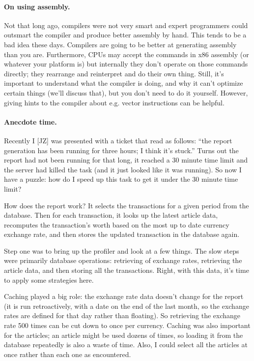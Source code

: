\documentclass[a4paper]{report}
\begin{document}
\paragraph{On using assembly.} Not that long ago, compilers were not very smart and expert programmers could outsmart the compiler and produce better assembly by hand. This tends to be a bad idea these days. Compilers are going to be better at generating assembly than you are. Furthermore, CPUs may accept the commands in x86 assembly (or whatever your platform is) but internally they don't operate on those commands directly; they rearrange and reinterpret and do their own thing. Still, it's important to understand what the compiler is doing, and why it can't optimize certain things (we'll discuss that), but you don't need to do it yourself. However, giving hints to the compiler about e.g. vector instructions can be helpful.

\paragraph{Anecdote time.} Recently I [JZ] was presented with a ticket that read as follows: ``the report generation has been running for three hours; I think it's stuck.'' Turns out the report had not been running for that long, it reached a 30 minute time limit and the server had killed the task (and it just looked like it was running). So now I have a puzzle: how do I speed up this task to get it under the 30 minute time limit?

How does the report work? It selects the transactions for a given period from the database. Then for each transaction, it looks up the latest article data, recomputes the transaction's worth based on the most up to date currency exchange rate, and then stores the updated transaction in the database again.

Step one was to bring up the profiler and look at a few things. The slow steps were primarily database operations: retrieving of exchange rates, retrieving the article data, and then storing all the transactions. Right, with this data, it's time to apply some strategies here.

Caching played a big role: the exchange rate data doesn't change for the report (it is run retroactively, with a date on the end of the last month, so the exchange rates are defined for that day rather than floating). So retrieving the exchange rate 500 times can be cut down to once per currency. Caching was also important for the articles; an article might be used dozens of times, so loading it from the database repeatedly is also a waste of time. Also, I could select all the articles at once rather than each one as encountered.
\end{document}
